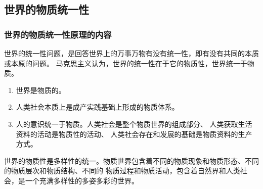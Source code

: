 \documentclass[10pt, UTF8]{book} %
\begin{document}
\subsection{世界的物质统一性}

\subsubsection{世界的物质统一性原理的内容}

世界的统一性问题，是回答世界上的万事万物有没有统一性，即有没有共同的本质或本原的问题。
马克思主义认为，世界的统一性在于它的物质性，世界统一于物质。
\begin{enumerate}[label={${\arabic*}^\circ$}, itemsep=0pt]
    \item {\kaishu 世界是物质的。}
    \item {\kaishu 人类社会本质上是成产实践基础上形成的物质体系。}
    \item {\kaishu 人的意识统一于物质。}人类社会是整个物质世界的组成部分、
    人类获取生活资料的活动是物质性的活动、
    人类社会存在和发展的基础是物质资料的生产方式。
\end{enumerate}
世界的物质性是多样性的统一。物质世界包含着不同的物质现象和物质形态、不同的物质层次和物质结构、不同的
物质过程和物质活动，包含着自然界和人类社会，是一个充满多样性的多姿多彩的世界。

    
\end{document}
